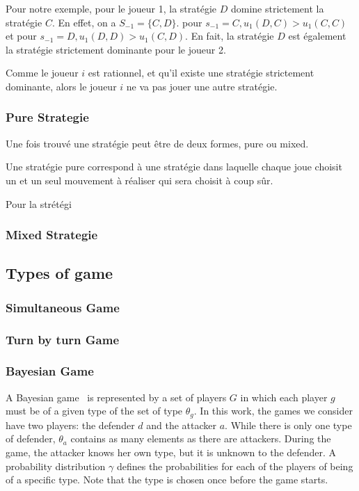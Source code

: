 Pour notre exemple, pour le joueur 1, la strat\'egie $D$ domine strictement la strat\'egie $C$. En effet, on a $S_{-1} = \{C, D\}$. pour $s_{-1} = {C}, u_1(D, C) > u_1(C, C)$ et pour $s_{-1} = {D}, u_1(D, D) > u_1(C, D)$. En fait, la strat\'egie $D$ est \'egalement la strat\'egie strictement dominante pour le joueur 2.

Comme le joueur $i$ est rationnel, et qu'il existe une strat\'egie strictement dominante, alors le joueur $i$ ne va pas jouer une autre strat\'egie.

\subsubsection{Pure Strategie}

Une fois trouvé une stratégie peut être de deux formes, pure ou mixed.

Une stratégie pure correspond à une stratégie dans laquelle chaque joue choisit un et un seul mouvement à réaliser qui sera choisit à coup sûr.

Pour la strétégi

\subsubsection{Mixed Strategie}

\subsection{Types of game}

\subsubsection{Simultaneous Game}

\subsubsection{Turn by turn Game}

\subsubsection{Bayesian Game}

A Bayesian game~\cite{paruchuri_efcient_nodate} is represented by a set of players $G$ in which each player $g$ must be of a given type of the set of type $\theta_g$. In this work, the games we consider have two players: the defender $d$ and the attacker $a$. While there is only one type of defender, $\theta_a$ contains as many elements as there are attackers. 
During the game, the attacker knows her own type, but it is unknown to the defender. A probability distribution $\gamma$ defines the probabilities for each of the players of being of a specific type. Note that the type is chosen once before the game starts.

